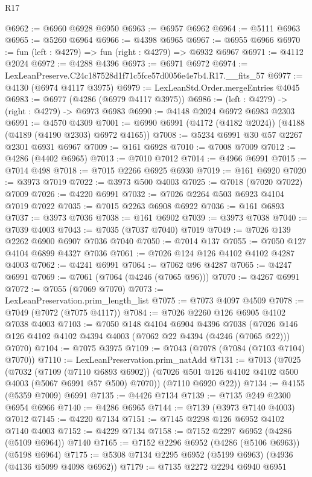 \begin{lexlean}{R17}
\begin{coremodule}
@6962 := @6960 @6928 @6950
@6963 := @6957 @6962
@6964 := @5111 @6963
@6965 := @5260 @6964
@6966 := @4398 @6965
@6967 := @6955 @6966
@6970 := fun (left : @4279) => fun (right : @4279) => @6932 @6967
@6971 := @4112 @2024
@6972 := @4288 @4396
@6973 := @6971 @6972
@6974 := LexLeanPreserve.C24c187528d1f71c5fce57d0056e4e7b4.R17.__fits_57
@6977 := @4130 (@6974 @4117 @3975)
@6979 := LexLeanStd.Order.mergeEntries @4045
@6983 := @6977 (@4286 (@6979 @4117 @3975))
@6986 := (left : @4279) -> (right : @4279) -> @6973 @6983
@6990 := @4148 @2024 @6972 @6983 @2303
@6991 := @4570 @4309
@7001 := @6990 @6991 (@4172 (@4182 @2024)) (@4188 (@4189 (@4190 @2303) @6972 @4165))
@7008 := @5234 @6991 @30 @57 @2267 @2301 @6931 @6967
@7009 := @161 @6928
@7010 := @7008 @7009
@7012 := @4286 (@4402 @6965)
@7013 := @7010 @7012
@7014 := @4966 @6991
@7015 := @7014 @498
@7018 := @7015 @2266 @6925 @6930
@7019 := @161 @6920
@7020 := @3973 @7019
@7022 := @3973 @500 @4003
@7025 := @7018 (@7020 @7022) @7009
@7026 := @4220 @6991
@7032 := @7026 @2264 @503 @6923 @4104 @7019 @7022
@7035 := @7015 @2263 @6908 @6922
@7036 := @161 @6893
@7037 := @3973 @7036
@7038 := @161 @6902
@7039 := @3973 @7038
@7040 := @7039 @4003
@7043 := @7035 (@7037 @7040) @7019
@7049 := @7026 @139 @2262 @6900 @6907 @7036 @7040
@7050 := @7014 @137
@7055 := @7050 @127 @4104 @6899 @4327 @7036
@7061 := @7026 @124 @126 @4102 @4102 @4287 @4003
@7062 := @4241 @6991
@7064 := @7062 @96 @4287
@7065 := @4247 @6991
@7069 := @7061 (@7064 (@4246 (@7065 @96)))
@7070 := @4267 @6991
@7072 := @7055 (@7069 @7070)
@7073 := LexLeanPreservation.prim_length_list
@7075 := @7073 @4097 @4509
@7078 := @7049 (@7072 (@7075 @4117))
@7084 := @7026 @2260 @126 @6905 @4102 @7038 @4003
@7103 := @7050
    @148
    @4104
    @6904
    @4396
    @7038
    (@7026 @146 @126 @4102 @4102 @4394 @4003 (@7062 @22 @4394 (@4246 (@7065 @22))) @7070)
@7104 := @7075 @3975
@7109 := @7043 (@7078 (@7084 (@7103 @7104) @7070))
@7110 := LexLeanPreservation.prim_natAdd
@7131 := @7013
    (@7025
      (@7032
        (@7109 (@7110 @6893 @6902))
        (@7026 @501 @126 @4102 @4102 @500 @4003 (@5067 @6991 @57 @500) @7070))
      (@7110 @6920 @22))
@7134 := @4155 (@5359 @7009) @6991
@7135 := @4426 @7134
@7139 := @7135 @249 @2300 @6954 @6966
@7140 := @4286 @6965
@7144 := @7139 (@3973 @7140 @4003) @7012
@7145 := @4220 @7134
@7151 := @7145 @2298 @126 @6952 @4102 @7140 @4003
@7152 := @4229 @7134
@7158 := @7152 @2297 @6952 (@4286 (@5109 @6964)) @7140
@7165 := @7152 @2296 @6952 (@4286 (@5106 @6963)) (@5198 @6964)
@7175 := @5308 @7134 @2295 @6952 (@5199 @6963) (@4936 (@4136 @5099 @4098 @6962))
@7179 := @7135 @2272 @2294 @6940 @6951

\end{coremodule}
\end{lexlean}
